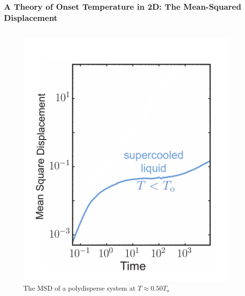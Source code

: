 
\begin{frame}[c]\label{c.1}
\frametitle{A Theory of Onset Temperature in 2D: The Mean-Squared Displacement}


\begin{columns}[T]
\begin{column}[T]{0.4\textwidth}
\vspace{-12pt}
\begin{figure}[t]
\begin{overprint}

\includegraphics[height=0.75\textheight]{c.1-kt_msdintro/msd-supercooledliq-0.pdf}\caption{The MSD of a polydisperse system at $ T \approx 0.50 T_\mathrm{o}$}



\end{overprint}
\end{figure}
\end{column}
\end{columns}
\end{frame}
